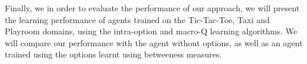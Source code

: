 Finally, we in order to evaluate the performance of our approach, we will
present the learning performance of agents trained on the Tic-Tac-Toe, Taxi and
Playroom domains, using the intra-option and macro-Q learning algorithms. We
will compare our performance with the agent without options, as well as an
agent trained using the options learnt using betweeness measures. 

